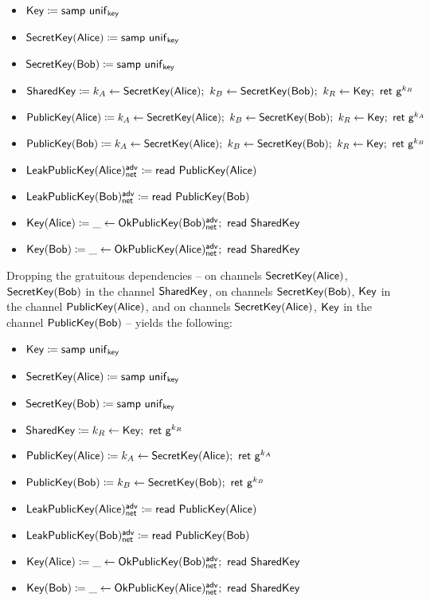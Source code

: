 \begin{itemize}
\item $\Key \coloneqq \samp{\unif_\key}$
\item $\SecretKey(\Alice) \coloneqq \samp{\unif_\key}$
\item $\SecretKey(\Bob) \coloneqq \samp{\unif_\key}$
\item {\color{red} $\SharedKey \coloneqq k_A \leftarrow \SecretKey(\Alice); \ k_B \leftarrow \SecretKey(\Bob); \ k_R \leftarrow \Key; \ \ret{\gen^{k_R}}$}
\item {\color{red} $\PublicKey(\Alice) \coloneqq k_A \leftarrow \SecretKey(\Alice); \ k_B \leftarrow \SecretKey(\Bob); \ k_R \leftarrow \Key; \ \ret{\gen^{k_A}}$}
\item {\color{red} $\PublicKey(\Bob) \coloneqq k_A \leftarrow \SecretKey(\Alice); \ k_B \leftarrow \SecretKey(\Bob); \ k_R \leftarrow \Key; \ \ret{\gen^{k_B}}$}
\item $\LeakPublicKey(\Alice)^\adv_\net \coloneqq \read{\PublicKey(\Alice)}$
\item $\LeakPublicKey(\Bob)^\adv_\net \coloneqq \read{\PublicKey(\Bob)}$
\item $\Key(\Alice) \coloneqq \_ \leftarrow \OkPublicKey(\Bob)^\adv_\net; \ \read{\SharedKey}$
\item $\Key(\Bob) \coloneqq \_ \leftarrow \OkPublicKey(\Alice)^\adv_\net; \ \read{\SharedKey}$
\end{itemize}

\noindent Dropping the gratuitous dependencies -- on channels $\SecretKey(\Alice)$, $\SecretKey(\Bob)$ in the channel $\SharedKey$,
on channels $\SecretKey(\Bob)$, $\Key$ in the channel $\PublicKey(\Alice)$, and on channels $\SecretKey(\Alice)$, $\Key$ in the channel $\PublicKey(\Bob)$ -- yields the following:

\begin{itemize}
\item $\Key \coloneqq \samp{\unif_\key}$
\item $\SecretKey(\Alice) \coloneqq \samp{\unif_\key}$
\item $\SecretKey(\Bob) \coloneqq \samp{\unif_\key}$
\item {\color{red} $\SharedKey \coloneqq k_R \leftarrow \Key; \ \ret{\gen^{k_R}}$}
\item {\color{red} $\PublicKey(\Alice) \coloneqq k_A \leftarrow \SecretKey(\Alice); \ \ret{\gen^{k_A}}$}
\item {\color{red} $\PublicKey(\Bob) \coloneqq k_B \leftarrow \SecretKey(\Bob); \ \ret{\gen^{k_B}}$}
\item $\LeakPublicKey(\Alice)^\adv_\net \coloneqq \read{\PublicKey(\Alice)}$
\item $\LeakPublicKey(\Bob)^\adv_\net \coloneqq \read{\PublicKey(\Bob)}$
\item $\Key(\Alice) \coloneqq \_ \leftarrow \OkPublicKey(\Bob)^\adv_\net; \ \read{\SharedKey}$
\item $\Key(\Bob) \coloneqq \_ \leftarrow \OkPublicKey(\Alice)^\adv_\net; \ \read{\SharedKey}$
\end{itemize}

